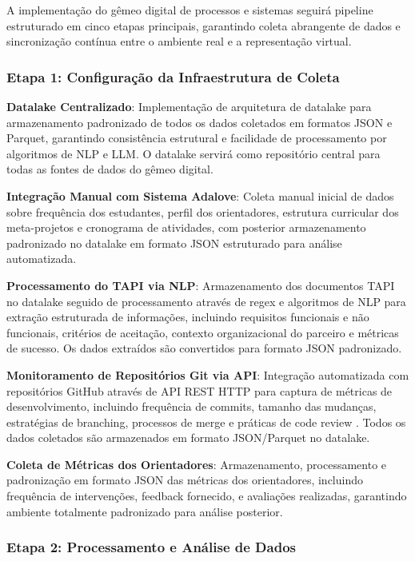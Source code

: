 \documentclass[12pt,a4paper]{article}
\begin{document}
A implementação do gêmeo digital de processos e sistemas seguirá pipeline estruturado em cinco etapas principais, garantindo coleta abrangente de dados e sincronização contínua entre o ambiente real e a representação virtual.

\subsubsection{Etapa 1: Configuração da Infraestrutura de Coleta}

\textbf{Datalake Centralizado}: Implementação de arquitetura de datalake para armazenamento padronizado de todos os dados coletados em formatos JSON e Parquet, garantindo consistência estrutural e facilidade de processamento por algoritmos de NLP e LLM. O datalake servirá como repositório central para todas as fontes de dados do gêmeo digital.

\textbf{Integração Manual com Sistema Adalove}: Coleta manual inicial de dados sobre frequência dos estudantes, perfil dos orientadores, estrutura curricular dos meta-projetos e cronograma de atividades, com posterior armazenamento padronizado no datalake em formato JSON estruturado para análise automatizada.

\textbf{Processamento do TAPI via NLP}: Armazenamento dos documentos TAPI no datalake seguido de processamento através de regex e algoritmos de NLP para extração estruturada de informações, incluindo requisitos funcionais e não funcionais, critérios de aceitação, contexto organizacional do parceiro e métricas de sucesso. Os dados extraídos são convertidos para formato JSON padronizado.

\textbf{Monitoramento de Repositórios Git via API}: Integração automatizada com repositórios GitHub através de API REST HTTP \cite{kalliamvakou2014} para captura de métricas de desenvolvimento, incluindo frequência de commits, tamanho das mudanças, estratégias de branching, processos de merge e práticas de code review \cite{perezriverol2016}. Todos os dados coletados são armazenados em formato JSON/Parquet no datalake.

\textbf{Coleta de Métricas dos Orientadores}: Armazenamento, processamento e padronização em formato JSON das métricas dos orientadores, incluindo frequência de intervenções, feedback fornecido, e avaliações realizadas, garantindo ambiente totalmente padronizado para análise posterior.

\subsubsection{Etapa 2: Processamento e Análise de Dados}
\end{document}
